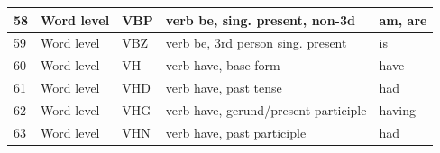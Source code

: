 \begin{longtable}{|p{}|p{}|p{}|p{}|p{}|}
		\rowcolor[HTML]{FFCCC9} 
		58                                                        & Word level                                                  & VBP                                                        & verb be, sing. present, non-3d                                                                                  & am, are                                                                         \\ \hline
		\rowcolor[HTML]{FFCCC9} 
		59                                                        & Word level                                                  & VBZ                                                        & verb be, 3rd person sing. present                                                                               & is                                                                              \\ \hline
		\rowcolor[HTML]{9AFF99} 
		60                                                        & Word level                                                  & VH                                                         & verb have, base form                                                                                            & have                                                                            \\ \hline
		\rowcolor[HTML]{9AFF99} 
		61                                                        & Word level                                                  & VHD                                                        & verb have, past tense                                                                                           & had                                                                             \\ \hline
		\rowcolor[HTML]{9AFF99} 
		62                                                        & Word level                                                  & VHG                                                        & verb have, gerund/present participle                                                                            & having                                                                          \\ \hline
		\rowcolor[HTML]{9AFF99} 
		63                                                        & Word level                                                  & VHN                                                        & verb have, past participle                                                                                      & had                                                                             \\ \hline

\end{longtable}
